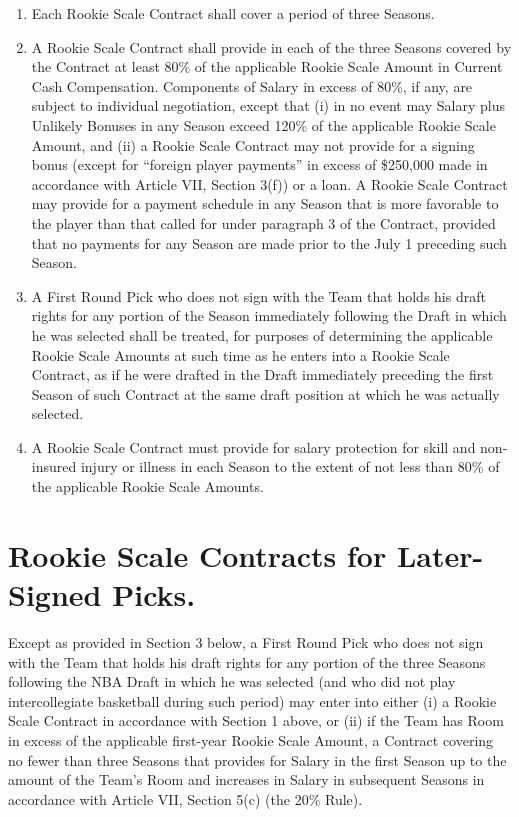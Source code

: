 \documentclass[
]{book}
\providecommand{\tightlist}{%
  \setlength{\itemsep}{0pt}\setlength{\parskip}{0pt}}
\begin{document}
\begin{enumerate}
\def\labelenumi{(\alph{enumi})}
\tightlist
\item
  Each Rookie Scale Contract shall cover a period of three Seasons.
\item
  A Rookie Scale Contract shall provide in each of the three Seasons covered by the Contract at least 80\% of the applicable Rookie Scale Amount in Current Cash Compensation. Components of Salary in excess of 80\%, if any, are subject to individual negotiation, except that (i) in no event may Salary plus Unlikely Bonuses in any Season exceed 120\% of the applicable Rookie Scale Amount, and (ii) a Rookie Scale Contract may not provide for a signing bonus (except for ``foreign player payments'' in excess of \$250,000 made in accordance with Article VII, Section 3(f)) or a loan. A Rookie Scale Contract may provide for a payment schedule in any Season that is more favorable to the player than that called for under paragraph 3 of the Contract, provided that no payments for any Season are made prior to the July 1 preceding such Season.
\item
  A First Round Pick who does not sign with the Team that holds his draft rights for any portion of the Season immediately following the Draft in which he was selected shall be treated, for purposes of determining the applicable Rookie Scale Amounts at such time as he enters into a Rookie Scale Contract, as if he were drafted in the Draft immediately preceding the first Season of such Contract at the same draft position at which he was actually selected.
\item
  A Rookie Scale Contract must provide for salary protection for skill and non-insured injury or illness in each Season to the extent of not less than 80\% of the applicable Rookie Scale Amounts.
\end{enumerate}

\hypertarget{rookie-scale-contracts-for-later-signed-picks.}{%
\section{Rookie Scale Contracts for Later-Signed Picks.}\label{rookie-scale-contracts-for-later-signed-picks.}}

Except as provided in Section 3 below, a First Round Pick who does not sign with the Team that holds his draft rights for any portion of the three Seasons following the NBA Draft in which he was selected (and who did not play intercollegiate basketball during such period) may enter into either (i) a Rookie Scale Contract in accordance with Section 1 above, or (ii) if the Team has Room in excess of the applicable first-year Rookie Scale Amount, a Contract covering no fewer than three Seasons that provides for Salary in the first Season up to the amount of the Team's Room and increases in Salary in subsequent Seasons in accordance with Article VII, Section 5(c) (the 20\% Rule).
\end{document}

